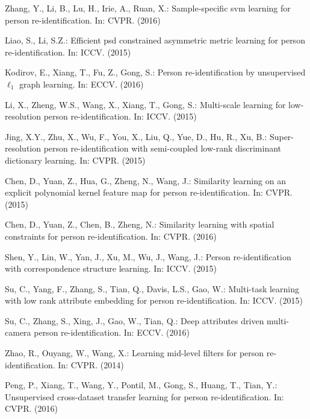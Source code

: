 \documentclass{llncs}
\begin{document}
\begin{thebibliography}{10}
Zhang, Y., Li, B., Lu, H., Irie, A., Ruan, X.:
\newblock Sample-specific svm learning for person re-identification.
\newblock In: CVPR. (2016)

Liao, S., Li, S.Z.:
\newblock Efficient psd constrained asymmetric metric learning for person
  re-identification.
\newblock In: ICCV. (2015)

Kodirov, E., Xiang, T., Fu, Z., Gong, S.:
\newblock Person re-identification by unsupervised $\ell_1$ graph learning.
\newblock In: ECCV. (2016)

Li, X., Zheng, W.S., Wang, X., Xiang, T., Gong, S.:
\newblock Multi-scale learning for low-resolution person re-identification.
\newblock In: ICCV. (2015)

Jing, X.Y., Zhu, X., Wu, F., You, X., Liu, Q., Yue, D., Hu, R., Xu, B.:
\newblock Super-resolution person re-identification with semi-coupled low-rank
  discriminant dictionary learning.
\newblock In: CVPR. (2015)

Chen, D., Yuan, Z., Hua, G., Zheng, N., Wang, J.:
\newblock Similarity learning on an explicit polynomial kernel feature map for
  person re-identification.
\newblock In: CVPR. (2015)

Chen, D., Yuan, Z., Chen, B., Zheng, N.:
\newblock Similarity learning with spatial constraints for person
  re-identification.
\newblock In: CVPR. (2016)

Shen, Y., Lin, W., Yan, J., Xu, M., Wu, J., Wang, J.:
\newblock Person re-identification with correspondence structure learning.
\newblock In: ICCV. (2015)

Su, C., Yang, F., Zhang, S., Tian, Q., Davis, L.S., Gao, W.:
\newblock Multi-task learning with low rank attribute embedding for person
  re-identification.
\newblock In: ICCV. (2015)

Su, C., Zhang, S., Xing, J., Gao, W., Tian, Q.:
\newblock Deep attributes driven multi-camera person re-identification.
\newblock In: ECCV. (2016)

Zhao, R., Ouyang, W., Wang, X.:
\newblock Learning mid-level filters for person re-identification.
\newblock In: CVPR. (2014)

Peng, P., Xiang, T., Wang, Y., Pontil, M., Gong, S., Huang, T., Tian, Y.:
\newblock Unsupervised cross-dataset transfer learning for person
  re-identification.
\newblock In: CVPR. (2016)


\end{thebibliography}
\end{document}
